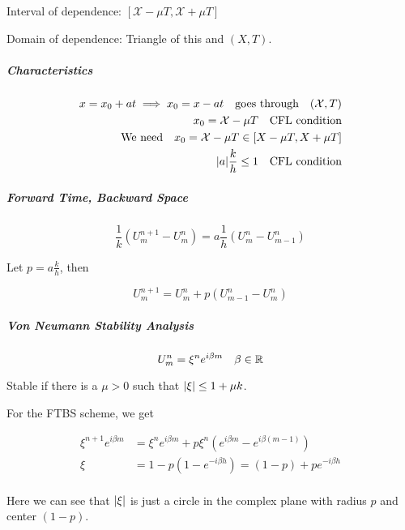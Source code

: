 Interval of dependence: \(\left[ \mathcal{X} - \mu T, \mathcal{X} + \mu T \right]\)

Domain of dependence: Triangle of this and \((X,T)\).

\subparagraph{Characteristics}

\begin{align*}
  x = x_0 + at \implies x_0 = x - at \quad \text{goes through} \quad (\mathcal{X}, T) \\
  x_0 = \mathcal{X} - \mu T \quad \text{CFL condition}                                \\
  \text{We need} \quad x_0 = \mathcal{X} - \mu T \in [X - \mu T, X + \mu T]           \\
  \lvert a\rvert \frac{k}{h} \leq 1 \quad \text{CFL condition}
\end{align*}

\subparagraph{Forward Time, Backward Space}
\[
  \frac{1}{k}\left( U_m^{n+1} - U_m^n \right) = a \frac{1}{h}\left( U_m^n - U_{m-1}^n \right)
\]

Let \(p = a \frac{k}{h}\), then

\[
  U_m^{n+1} = U_m^n + p(U_{m-1}^n - U_m^n)
\]

\subparagraph{Von Neumann Stability Analysis}
\[
  U_m^n = \xi^n e^{i\beta m} \quad \beta \in \mathbb{R}
\]

Stable if there is a \(\mu> 0\) such that \(\lvert\xi\rvert \leq 1 + \mu k \).

For the FTBS scheme, we get

\begin{align*}
  \xi^{n+1} e^{i\beta m} & = \xi^n e^{i\beta m} + p\xi^n\left( e^{i\beta m} - e^{i\beta (m-1)} \right) \\
  \xi                    & = 1 - p(1 - e^{-i\beta h}) = (1 - p) + pe^{-i\beta h}                       \\
\end{align*}

Here we can see that \(\lvert\xi\rvert \) is just a circle in the complex plane with radius \(p\) and center \((1-p)\).


